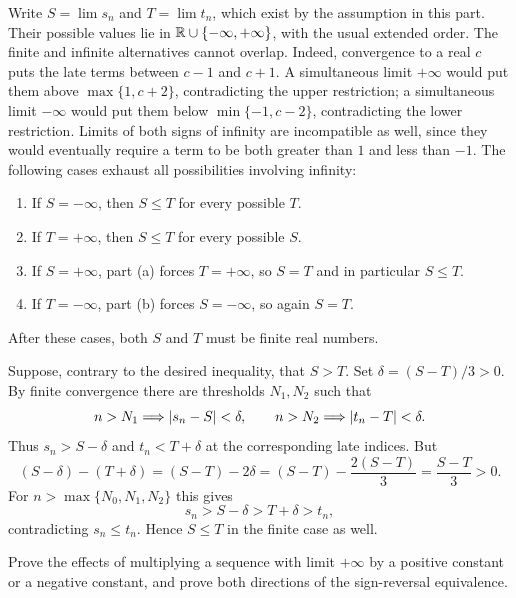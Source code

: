 Write $S=\lim s_n$ and $T=\lim t_n$, which exist by the
assumption in this part. Their possible values lie in
$\mathbb{R}\cup\{-\infty,+\infty\}$, with the usual extended order.
The finite and infinite alternatives cannot overlap. Indeed,
convergence to a real $c$ puts the late terms between $c-1$
and $c+1$. A simultaneous limit $+\infty$ would put them
above $\max\{1,c+2\}$, contradicting the upper restriction;
a simultaneous limit $-\infty$ would put them below
$\min\{-1,c-2\}$, contradicting the lower restriction.
Limits of both signs of infinity are incompatible as well,
since they would eventually require a term to be both greater
than $1$ and less than $-1$.
The following cases exhaust all possibilities involving infinity:
\begin{enumerate}
 \item If $S=-\infty$, then $S\leq T$ for every possible $T$.
 \item If $T=+\infty$, then $S\leq T$ for every possible $S$.
 \item If $S=+\infty$, part (a) forces $T=+\infty$, so
       $S=T$ and in particular $S\leq T$.
 \item If $T=-\infty$, part (b) forces $S=-\infty$, so
       again $S=T$.
\end{enumerate}
After these cases, both $S$ and $T$ must be finite real numbers.

Suppose, contrary to the desired inequality, that $S>T$.
Set $\delta=(S-T)/3>0$. By finite convergence there are
thresholds $N_1,N_2$ such that
\[
 n>N_1\Longrightarrow\left|s_n-S\right|<\delta,
 \qquad
 n>N_2\Longrightarrow\left|t_n-T\right|<\delta.
\]
Thus $s_n>S-\delta$ and $t_n<T+\delta$ at the corresponding
late indices. But
\[
 (S-\delta)-(T+\delta)
 =(S-T)-2\delta
 =(S-T)-\frac{2(S-T)}3
 =\frac{S-T}{3}>0.
\]
For $n>\max\{N_0,N_1,N_2\}$ this gives
\[
 s_n>S-\delta>T+\delta>t_n,
\]
contradicting $s_n\leq t_n$. Hence $S\leq T$ in the finite
case as well.



\goal Prove the effects of multiplying a sequence with limit
$+\infty$ by a positive constant or a negative constant, and
prove both directions of the sign-reversal equivalence.

